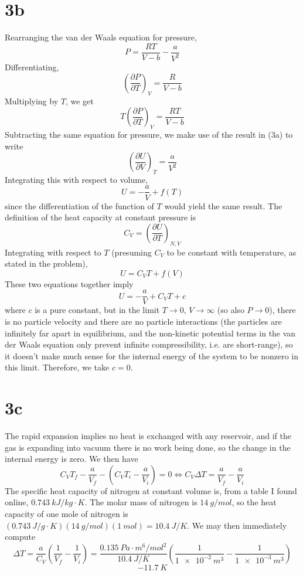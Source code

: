 \documentclass{article}
\begin{document}
\section*{3b}
Rearranging the van der Waals equation for pressure,
\[P=\frac{RT}{V-b}-\frac{a}{V^{2}}\]
Differentiating,
\[\left( \frac{\partial P}{\partial T} \right)_{V}=\frac{R}{V-b}\]
Multiplying by $T$, we get
\[T\left( \frac{\partial P}{\partial T} \right)_{V}=\frac{RT}{V-b}\]
Subtracting the same equation for pressure, we make use of the result in (3a) to write
\[\left( \frac{\partial U}{\partial V} \right)_{T}=\frac{a}{V^{2}}\]
Integrating this with respect to volume,
\[U=-\frac{a}{V}+f(T)\]
since the differentiation of the function of $T$ would yield the same result.
The definition of the heat capacity at constant pressure is
\[C_{V}=\left( \frac{\partial U}{\partial T} \right)_{N,V}\]
Integrating with respect to $T$ (presuming $C_{V}$ to be constant with temperature, as stated in the problem),
\[U=C_{V}T+f(V)\]
These two equations together imply
\[U=-\frac{a}{V}+C_{V}T+c\]
where $c$ is a pure constant, but in the limit $T\to 0$, $V\to \infty$ (so also $P \to 0$), there is no particle velocity and there are no particle interactions (the particles are infinitely far apart in equilibrium, and the non-kinetic potential terms in the van der Waals equation only prevent infinite compressibility, i.e. are short-range), so it doesn't make much sense for the internal energy of the system to be nonzero in this limit.
Therefore, we take $c=0$.

\section*{3c}
The rapid expansion implies no heat is exchanged with any reservoir, and if the gas is expanding into vacuum there is no work being done, so the change in the internal energy is zero.
We then have
\[C_{V}T_{f}-\frac{a}{V_{f}}-\left( C_{V}T_{i}-\frac{a}{V_{i}} \right)=0\Leftrightarrow C_{V}\Delta T=\frac{a}{V_{f}}-\frac{a}{V_{i}}\]
The specific heat capacity of nitrogen at constant volume is, from a table I found online, $\SI{0.743}{kJ/kg\cdot K}$. The molar mass of nitrogen is $\SI{14}{g/mol}$, so the heat capacity of one mole of nitrogen is \newline $(\SI{0.743}{J/g\cdot K})(\SI{14}{g/mol})(\SI{1}{mol})=\SI{10.4}{J/K}$. We may then immediately compute
\[\Delta T=\frac{a}{C_{V}}\left( \frac{1}{V_{f}}-\frac{1}{V_{i}} \right)=\frac{\SI{0.135}{Pa\cdot m^{6}/mol^{2}}}{\SI{10.4}{J/K}}\left( \frac{1}{\SI{1e-2}{m^{3}}}-\frac{1}{\SI{1e-3}{m^{3}}} \right)\]
\[\SI{-11.7}{K}\]
\end{document}
